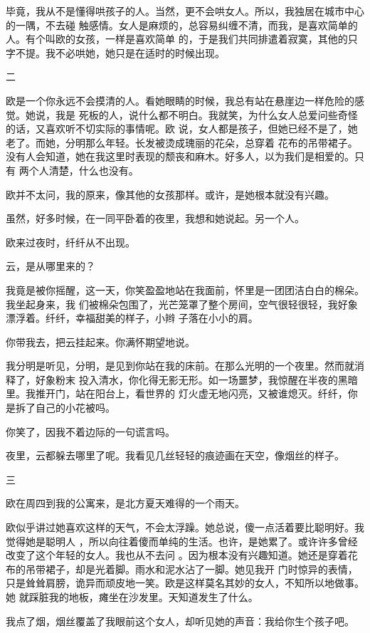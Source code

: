 \documentclass[12pt,a4paper]{article}
\newcommand{\subpart}[1]{
	\begingroup \par
	\vspace{1ex} \centering #1
	\par \endgroup
}
\begin{document}
		毕竟，我从不是懂得哄孩子的人。当然，更不会哄女人。所以，我独居在城市中心的一隅，不去碰
	触感情。女人是麻烦的，总容易纠缠不清，而我，是喜欢简单的人。有个叫欧的女孩，一样是喜欢简单
	的，于是我们共同排遣着寂寞，其他的只字不提。我不必哄她，她只是在适时的时候出现。

		\subpart{二}

		欧是一个你永远不会摸清的人。看她眼睛的时候，我总有站在悬崖边一样危险的感觉。她说，我是
	死板的人，说什么都不明白。我就笑，为什么女人总爱问些奇怪的话，又喜欢听不切实际的事情呢。欧
	说，女人都是孩子，但她已经不是了，她老了。而她，分明那么年轻。长发被烫成瑰丽的花朵，总穿着
	花布的吊带裙子。没有人会知道，她在我这里时表现的颓丧和麻木。好多人，以为我们是相爱的。只有
	两个人清楚，什么也没有。

		欧并不太问，我的原来，像其他的女孩那样。或许，是她根本就没有兴趣。\par
		虽然，好多时候，在一同平卧着的夜里，我想和她说起。另一个人。\par
		欧来过夜时，纤纤从不出现。\par
		云，是从哪里来的？

		我竟是被你摇醒，这一天，你笑盈盈地站在我面前，怀里是一团团洁白白的棉朵。我坐起身来，我
	们被棉朵包围了，光芒笼罩了整个房间，空气很轻很轻，我好象漂浮着。纤纤，幸福甜美的样子，小辫
	子落在小小的肩。

		你带我去，把云挂起来。你满怀期望地说。

		我分明是听见，分明，是见到你站在我的床前。在那么光明的一个夜里。然而就消释了，好象粉末
	投入清水，你化得无影无形。如一场噩梦，我惊醒在半夜的黑暗里。我推开门，站在阳台上，看世界的
	灯火虚无地闪亮，又被谁熄灭。纤纤，你是拆了自己的小花被吗。

		你笑了，因我不着边际的一句谎言吗。\par
		夜里，云都躲去哪里了呢。我看见几丝轻轻的痕迹画在天空，像烟丝的样子。

		\subpart{三}

		欧在周四到我的公寓来，是北方夏天难得的一个雨天。

		欧似乎讲过她喜欢这样的天气，不会太浮躁。她总说，傻一点活着要比聪明好。我觉得她是聪明人
	，所以向往着傻而单纯的生活。也许，是她累了。或许许多曾经改变了这个年轻的女人。我也从不去问
	。因为根本没有兴趣知道。她还是穿着花布的吊带裙子，却是光着脚。雨水和泥水沾了一脚。她见我开
	门时惊异的表情，只是耸耸肩膀，诡异而顽皮地一笑。欧是这样莫名其妙的女人，不知所以地做事。她
	就踩脏我的地板，瘫坐在沙发里。天知道发生了什么。

		我点了烟，烟丝覆盖了我眼前这个女人，却听见她的声音：我给你生个孩子吧。
\end{document}
